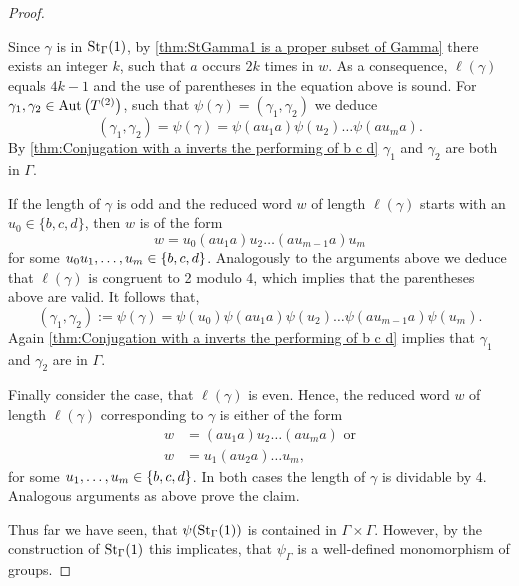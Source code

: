 \begin{proof}
\begin{clist}
Since $\gamma$ is in $\St[\Gamma]{1}$, by \cref{thm:StGamma1 is a proper subset of Gamma} there exists an integer $k$, such that $a$ occurs $2k$ times in $w$. As a consequence, $\ell(\gamma)$ equals $4k-1$ and the use of parentheses in the equation above is sound. For $\gamma_1,\gamma_2\in\AutT$, such that $\psi(\gamma)=(\gamma_1,\gamma_2)$ we deduce
\begin{equation*}
(\gamma_1,\gamma_2)=\psi(\gamma)=\psi(au_1a)\psi(u_2)\ldots \psi(au_ma).
\end{equation*}
By \cref{thm:Conjugation with a inverts the performing of b c d} $\gamma_1$ and $\gamma_2$ are both in $\Gamma$.
\item If the length of $\gamma$ is odd and the reduced word $w$ of length $\ell(\gamma)$ starts with an $u_0\in\lbrace b,c,d\rbrace$, then $w$ is of the form
\begin{equation*}
w=u_0(au_1a)u_2\ldots (au_{m-1}a)u_m
\end{equation*}
for some $u_0\seq[m]{u}\in\lbrace b,c,d\rbrace$. Analogously to the arguments above we deduce that $\ell(\gamma)$ is congruent to 2 modulo 4, which implies that the parentheses above are valid. It follows that,
\begin{equation*}
(\gamma_1,\gamma_2):=\psi(\gamma)=\psi(u_0)\psi(au_1a)\psi(u_2)\ldots \psi(au_{m-1}a)\psi(u_m).
\end{equation*}
Again \cref{thm:Conjugation with a inverts the performing of b c d} implies that $\gamma_1$ and $\gamma_2$ are in $\Gamma$.
\item Finally consider the case, that $\ell(\gamma)$ is even. Hence, the reduced word $w$ of length $\ell(\gamma)$ corresponding to $\gamma$ is either of the form
\begin{align*}
w&=(au_1a)u_2\ldots (au_ma) \text{ or}\\
w&=u_1(au_2a)\ldots u_m,
\end{align*}
for some $\seq[m]{u}\in\lbrace b,c,d\rbrace$. In both cases the length of $\gamma$ is dividable by 4. Analogous arguments as above prove the claim.
\end{clist}
Thus far we have seen, that $\psi(\St[\Gamma]{1})$ is contained in $\Gamma\times\Gamma$. However, by the construction of $\St[\Gamma]{1}$ this implicates, that $\psi_\Gamma$ is a well-defined monomorphism of groups.
\end{proof}

